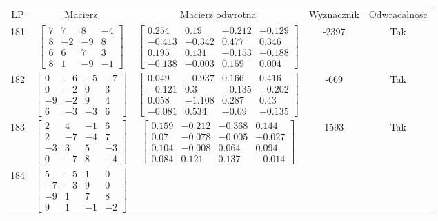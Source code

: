 \documentclass[a4paper,12pt]{article}
\begin{document}
\bgroup {} \vspace{0.2in} \begin{tabular}{c c c c c}
LP & Macierz & Macierz odwrotna & Wyznacznik & Odwracalnosc\\
181
&
$\begin{bmatrix} 7 & 7 & 8 & -4 \\ 8 & -2 & -9 & 8 \\ 6 & 6 & 7 & 3 \\ 8 & 1 & -9 & -1 \end{bmatrix}$
&
$\begin{bmatrix} 0.254 & 0.19 & -0.212 & -0.129 \\ -0.413 & -0.342 & 0.477 & 0.346 \\ 0.195 & 0.131 & -0.153 & -0.188 \\ -0.138 & -0.003 & 0.159 & 0.004 \end{bmatrix}$
&
-2397
&
Tak
\\
182
&
$\begin{bmatrix} 0 & -6 & -5 & -7 \\ 0 & -2 & 0 & 3 \\ -9 & -2 & 9 & 4 \\ 6 & -3 & -3 & 6 \end{bmatrix}$
&
$\begin{bmatrix} 0.049 & -0.937 & 0.166 & 0.416 \\ -0.121 & 0.3 & -0.135 & -0.202 \\ 0.058 & -1.108 & 0.287 & 0.43 \\ -0.081 & 0.534 & -0.09 & -0.135 \end{bmatrix}$
&
-669
&
Tak
\\
183
&
$\begin{bmatrix} 2 & 4 & -1 & 6 \\ 2 & -7 & -4 & 7 \\ -3 & 3 & 5 & -3 \\ 0 & -7 & 8 & -4 \end{bmatrix}$
&
$\begin{bmatrix} 0.159 & -0.212 & -0.368 & 0.144 \\ 0.07 & -0.078 & -0.005 & -0.027 \\ 0.104 & -0.008 & 0.064 & 0.094 \\ 0.084 & 0.121 & 0.137 & -0.014 \end{bmatrix}$
&
1593
&
Tak
\\
184
&
$\begin{bmatrix} 5 & -5 & 1 & 0 \\ -7 & -3 & 9 & 0 \\ -9 & 1 & 7 & 8 \\ 9 & 1 & -1 & -2 \end{bmatrix}$

\end{tabular}
\end{document}
